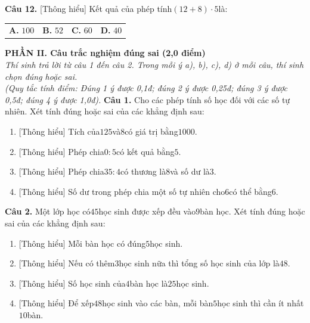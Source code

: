 \documentclass[11pt,a4paper]{article}
\begin{document}
\noindent\textbf{Câu 12.} [Thông hiểu] Kết quả của phép tính$(12 + 8) \cdot 5$là:\par\vspace{2pt}
\noindent\begin{tabular*}{\textwidth}{@{\extracolsep{\fill}}llll@{}}
\textbf{A.} $100$ & \textbf{B.} $52$ & \textbf{C.} $60$ & \textbf{D.} $40$
\end{tabular*}\par\vspace{5pt}


\vspace{6pt}
\noindent
\textbf{\large PHẦN II. Câu trắc nghiệm đúng sai (2,0 điểm)}\\
\textit{\small Thí sinh trả lời từ câu 1 đến câu 2. Trong mỗi ý a), b), c), d) ở mỗi câu, thí sinh chọn đúng hoặc sai.}\\
\textit{\small (Quy tắc tính điểm: Đúng 1 ý được 0,1đ; đúng 2 ý được 0,25đ; đúng 3 ý được 0,5đ; đúng 4 ý được 1,0đ).}
\vspace{6pt}
\noindent\textbf{Câu 1.} Cho các phép tính số học đối với các số tự nhiên. Xét tính đúng hoặc sai của các khẳng định sau:\par\vspace{2pt}
\begin{enumerate}[label=\textbf{\alph*)}, leftmargin=1.2cm, itemsep=2pt, topsep=2pt]
  \item \textnormal{[Thông hiểu]} Tích của$125$và$8$có giá trị bằng$1000$.
  \item \textnormal{[Thông hiểu]} Phép chia$0 : 5$có kết quả bằng$5$.
  \item \textnormal{[Thông hiểu]} Phép chia$35 : 4$có thương là$8$và số dư là$3$.
  \item \textnormal{[Thông hiểu]} Số dư trong phép chia một số tự nhiên cho$6$có thể bằng$6$.
\end{enumerate}
\vspace{6pt}

\noindent\textbf{Câu 2.} Một lớp học có$45$học sinh được xếp đều vào$9$bàn học. Xét tính đúng hoặc sai của các khẳng định sau:\par\vspace{2pt}
\begin{enumerate}[label=\textbf{\alph*)}, leftmargin=1.2cm, itemsep=2pt, topsep=2pt]
  \item \textnormal{[Thông hiểu]} Mỗi bàn học có đúng$5$học sinh.
  \item \textnormal{[Thông hiểu]} Nếu có thêm$3$học sinh nữa thì tổng số học sinh của lớp là$48$.
  \item \textnormal{[Thông hiểu]} Số học sinh của$4$bàn học là$25$học sinh.
  \item \textnormal{[Thông hiểu]} Để xếp$48$học sinh vào các bàn, mỗi bàn$5$học sinh thì cần ít nhất$10$bàn.
\end{enumerate}
\vspace{6pt}
\end{document}
